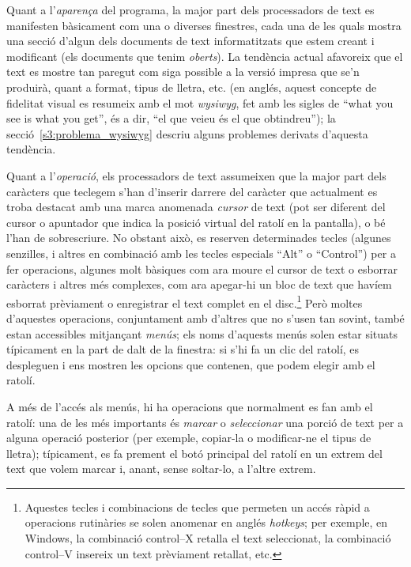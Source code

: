 Quant a l'\emph{aparença} del programa, la major part dels
processadors de text es manifesten bàsicament com una o diverses
finestres, cada una de les quals mostra una secció d'algun dels
documents de text informatitzats que estem creant i modificant (els
documents que tenim \emph{oberts}).  La tendència actual afavoreix que
el text es mostre tan paregut com siga possible a la versió impresa
que se'n produirà, quant a format, tipus de lletra, etc. (en anglés,
aquest concepte de fidelitat visual es resumeix amb el mot {\em
  wysiwyg}, fet amb les sigles de ``what you see is what you get'', és
a dir, ``el que veieu és el que obtindreu''); la
secció~\ref{s3:problema_wysiwyg} descriu alguns problemes derivats
d'aquesta tendència.

Quant a l'\emph{operació}, els processadors de text assumeixen que la major
part dels caràcters que teclegem s'han d'inserir darrere del caràcter
que actualment es troba destacat amb una marca anomenada {\em
  cursor} de text (pot ser diferent del cursor o apuntador que indica
la posició virtual del ratolí en la pantalla), o bé l'han de
sobrescriure. No obstant això, es reserven determinades tecles
(algunes senzilles, i altres en combinació amb les tecles especials
``Alt'' o ``Control'') per a fer operacions, algunes molt bàsiques com ara
moure el cursor de text o esborrar caràcters i altres més complexes,
com ara apegar-hi un bloc de text que havíem esborrat prèviament o
enregistrar el text complet en el disc.\footnote{Aquestes tecles i combinacions
de tecles que permeten un accés ràpid a operacions rutinàries se solen
anomenar en anglés \emph{hotkeys}; per exemple, en Windows, la
combinació control--X retalla el text seleccionat, la combinació
control--V insereix un text prèviament retallat, etc.} Però moltes d'aquestes
operacions, conjuntament amb d'altres que no s'usen tan sovint, també
estan accessibles mitjançant \emph{menús}; els noms d'aquests menús
solen estar situats típicament en la part de dalt de la finestra: si
s'hi fa un clic del ratolí, es despleguen i ens mostren les opcions
que contenen, que podem elegir amb el ratolí.

A més de l'accés als menús, hi ha operacions que normalment es fan amb
el ratolí: una de les més importants és \emph{marcar} o
\emph{seleccionar} una porció de text per a alguna operació posterior
(per exemple, copiar-la o modificar-ne el tipus de lletra);
típicament, es fa prement el botó principal del ratolí en un extrem
del text que volem marcar i, anant, sense soltar-lo, a l'altre extrem.

